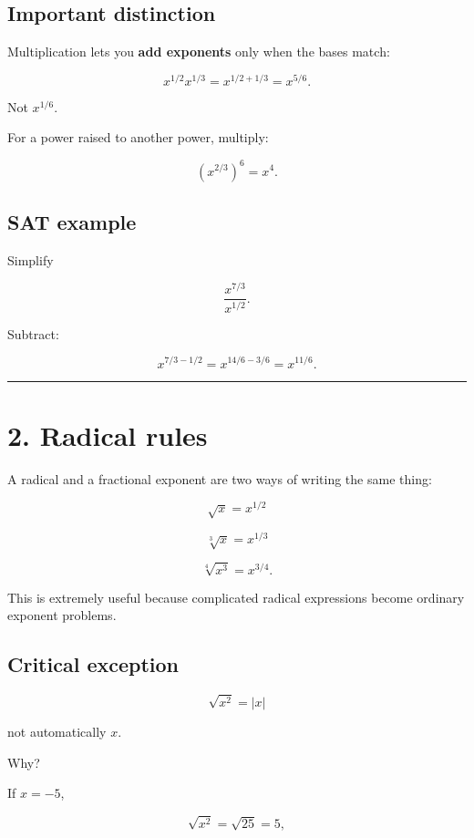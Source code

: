 \documentclass[
]{article}
\begin{document}
\subsection{Important distinction}\label{important-distinction}

Multiplication lets you \textbf{add exponents} only when the bases
match:

\[
x^{1/2}x^{1/3}
=
x^{1/2+1/3}
=
x^{5/6}.
\]

Not \(x^{1/6}\).

For a power raised to another power, multiply:

\[
(x^{2/3})^6=x^4.
\]

\subsection{SAT example}\label{sat-example}

Simplify

\[
\frac{x^{7/3}}{x^{1/2}}.
\]

Subtract:

\[
x^{7/3-1/2}
=
x^{14/6-3/6}
=
x^{11/6}.
\]

\begin{center}\rule{0.5\linewidth}{0.5pt}\end{center}

\section{2. Radical rules}\label{radical-rules}

A radical and a fractional exponent are two ways of writing the same
thing:

\[
\sqrt{x}=x^{1/2}
\]

\[
\sqrt[3]{x}=x^{1/3}
\]

\[
\sqrt[4]{x^3}=x^{3/4}.
\]

This is extremely useful because complicated radical expressions become
ordinary exponent problems.

\subsection{Critical exception}\label{critical-exception}

\[
\boxed{\sqrt{x^2}=|x|}
\]

not automatically \(x\).

Why?

If \(x=-5\),

\[
\sqrt{x^2}=\sqrt{25}=5,
\]
\end{document}
